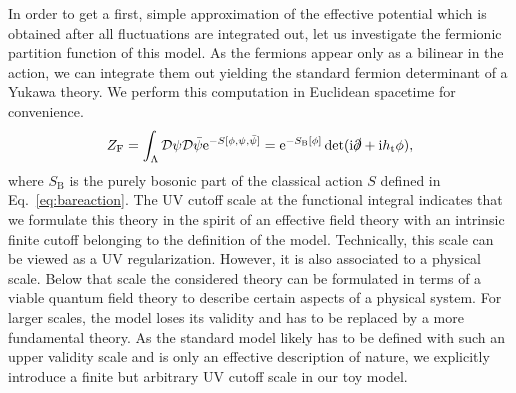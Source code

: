 \documentclass[twocolumn,aps,prd,showpacs,nofootinbib,superscriptaddress,preprintnumbers,floatfix,10pt]{revtex4-1}
\newcommand{\I}{\mathrm{i}}
\newcommand{\E}{\mathrm{e}}
\newcommand{\psib}{\bar{\psi}}
\newcommand{\htop}{h_{\mathrm{t}}}
\newcommand{\rmB}{\mathrm{B}}
\newcommand{\rmF}{\mathrm{F}}
\begin{document}
In order to get a first, simple approximation of the effective potential which is obtained after all fluctuations are integrated out, let us investigate the fermionic partition function of this model. As the fermions appear only as a bilinear in the action, we can integrate them out yielding the standard fermion determinant of a Yukawa theory. We perform this computation in Euclidean spacetime for convenience.
%
\begin{align}
 Z_{\rmF} = \int_{\Lambda} \mathcal{D}\psi \mathcal{D}\psib \E^{- S[\phi,\psi,\psib]} =  \E^{- S_{\rmB}[\phi]} \det(\I \slashed{\partial} + \I\htop\phi),
\end{align}
%
where $S_{\rmB}$ is the purely bosonic part of the classical action $S$ defined in Eq.~\eqref{eq:bareaction}. 
The UV cutoff scale at the functional integral indicates that we formulate this theory in the spirit of an effective field theory with an intrinsic finite cutoff belonging to the definition of the model. 
Technically, this scale can be viewed as a UV regularization.
However, it is also associated to a physical scale.
Below that scale the considered theory can be formulated in terms of a viable quantum field theory to describe certain aspects of a physical system.  For larger scales, the model loses its validity and has to be replaced by a more fundamental theory. 
As the standard model likely has to be defined with such an upper validity scale and is only an effective description of nature, we explicitly introduce a finite but arbitrary UV cutoff scale in our toy model.
\end{document}
